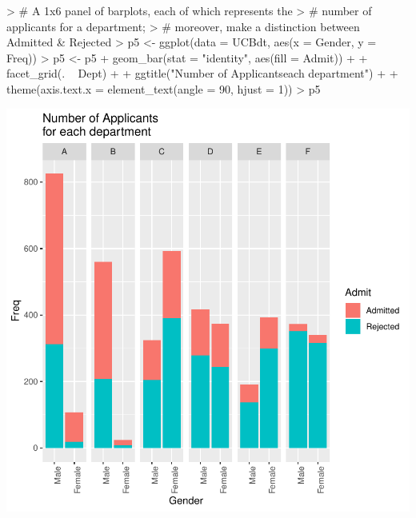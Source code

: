 \documentclass[12pt,letterpaper,final]{article}
\begin{document}
\begin{Schunk}
\begin{Sinput}
> # A 1x6 panel of barplots, each of which represents the 
> # number of applicants for a department;
> # moreover, make a distinction between Admitted & Rejected
> p5 <- ggplot(data = UCBdt, aes(x = Gender, y = Freq))
> p5 <- p5 + geom_bar(stat = "identity", aes(fill = Admit)) + 
+   facet_grid(. ~ Dept) + 
+   ggtitle("Number of Applicants\nfor each department") + 
+   theme(axis.text.x = element_text(angle = 90, hjust = 1))
> p5
\end{Sinput}
\end{Schunk}
\includegraphics{lect_main-021}
\end{document}
